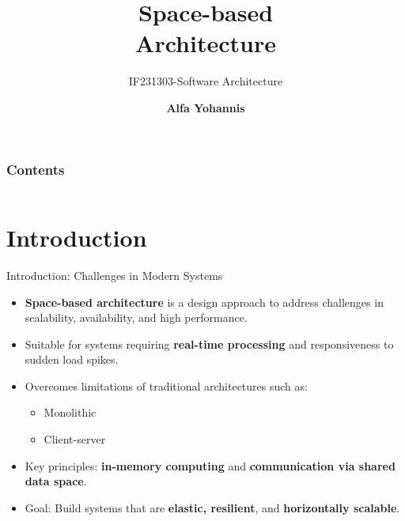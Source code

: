 \documentclass[aspectratio=169, table]{beamer}
\title{\Huge Space-based\\Architecture\\\vspace{10pt}}
\subtitle{IF231303-Software Architecture}
\author{\textbf{Alfa Yohannis}}
\begin{document}
	
	\frame{\titlepage}
	
	\begin{frame}[fragile]
		\frametitle{Contents}
		\vspace{20pt}
		\begin{columns}[t]
			\tableofcontents[sections={1-4}]
			
			\tableofcontents[sections={5-10}]
		\end{columns}
	\end{frame}
	
	
	\section{Introduction}
	
	\begin{frame}{Introduction: Challenges in Modern Systems}
		\vspace{20pt}
		\begin{itemize}
			\item \textbf{Space-based architecture} is a design approach to address challenges in scalability, availability, and high performance.
			\item Suitable for systems requiring \textbf{real-time processing} and responsiveness to sudden load spikes.
			\item Overcomes limitations of traditional architectures such as:
			\begin{itemize}
				\item Monolithic
				\item Client-server
			\end{itemize}
			\item Key principles: \textbf{in-memory computing} and \textbf{communication via shared data space}.
			\item Goal: Build systems that are \textbf{elastic, resilient}, and \textbf{horizontally scalable}.
		\end{itemize}
	\end{frame}
	
\end{document}
